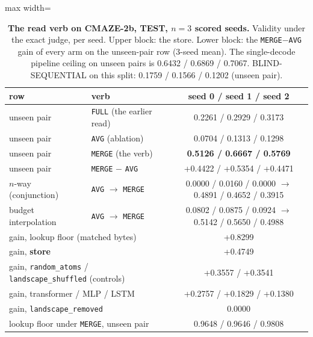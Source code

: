 \documentclass{article} %
\begin{document}
\begin{table}[t]
\centering\small
\caption{\textbf{The read verb on CMAZE-2b, TEST, $n=3$ scored seeds.} Validity under the exact
judge, per seed. Upper block: the store. Lower block: the \texttt{MERGE}$-$\texttt{AVG} gain of
every arm on the unseen-pair row (3-seed mean). The single-decode pipeline ceiling on unseen
pairs is 0.6432 / 0.6869 / 0.7067. BLIND-SEQUENTIAL on this split: 0.1759 / 0.1566 / 0.1202 %
(unseen pair).}
\label{tab:verb}
\setlength{\tabcolsep}{3pt}
\begin{adjustbox}{max width=\linewidth}\begin{tabular}{llc}
\toprule
row & verb & seed 0 / seed 1 / seed 2 \\
\midrule
unseen pair & \texttt{FULL} (the earlier read) & 0.2261 / 0.2929 / 0.3173 \\
unseen pair & \texttt{AVG} (ablation) & 0.0704 / 0.1313 / 0.1298 \\
unseen pair & \texttt{MERGE} (the verb) & \textbf{0.5126 / 0.6667 / 0.5769} \\
unseen pair & \texttt{MERGE} $-$ \texttt{AVG} & +0.4422 / +0.5354 / +0.4471 \\
$n$-way (conjunction) & \texttt{AVG} $\to$ \texttt{MERGE} & 0.0000 / 0.0160 / 0.0000 $\to$ 0.4891 / 0.4652 / 0.3915 \\
budget interpolation & \texttt{AVG} $\to$ \texttt{MERGE} & 0.0802 / 0.0875 / 0.0924 $\to$ 0.5142 / 0.5650 / 0.4988 \\
\midrule
\multicolumn{2}{l}{gain, lookup floor (matched bytes)} & +0.8299 \\
\multicolumn{2}{l}{gain, \textbf{store}} & +0.4749 \\
\multicolumn{2}{l}{gain, \texttt{random\_atoms} / \texttt{landscape\_shuffled} (controls)} & +0.3557 / +0.3541 \\
\multicolumn{2}{l}{gain, transformer / MLP / LSTM} & +0.2757 / +0.1829 / +0.1380 \\
\multicolumn{2}{l}{gain, \texttt{landscape\_removed}} & 0.0000 \\
\multicolumn{2}{l}{lookup floor under \texttt{MERGE}, unseen pair} & 0.9648 / 0.9646 / 0.9808 \\
\bottomrule
\end{tabular}\end{adjustbox}
\end{table}
\end{document}
